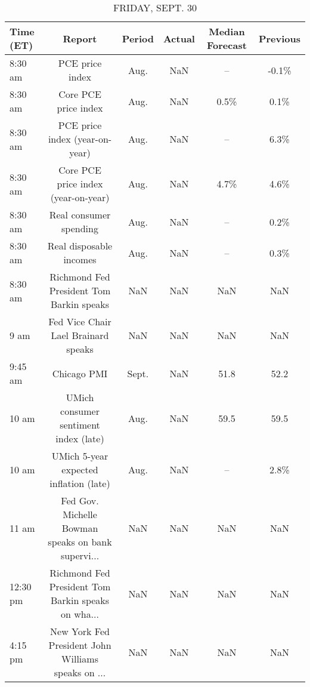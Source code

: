 \documentclass{book}
\begin{document}
  
  \begin{table}[htbp]%
  \caption{FRIDAY, SEPT. 30}%
  \centering%
  \begin{adjustbox}{width=1\textwidth}%
  \begin{tabular}{lccccc}
  \toprule
  Time (ET) &                                             Report & Period & Actual & Median Forecast & Previous \\
  \midrule
    8:30 am &                                    PCE price index &   Aug. &    NaN &              -- &    -0.1\% \\
    8:30 am &                               Core PCE price index &   Aug. &    NaN &            0.5\% &     0.1\% \\
    8:30 am &                     PCE price index (year-on-year) &   Aug. &    NaN &              -- &     6.3\% \\
    8:30 am &                Core PCE price index (year-on-year) &   Aug. &    NaN &            4.7\% &     4.6\% \\
    8:30 am &                             Real consumer spending &   Aug. &    NaN &              -- &     0.2\% \\
    8:30 am &                            Real disposable incomes &   Aug. &    NaN &              -- &     0.3\% \\
    8:30 am &           Richmond Fed President Tom Barkin speaks &    NaN &    NaN &             NaN &      NaN \\
       9 am &                Fed Vice Chair Lael Brainard speaks &    NaN &    NaN &             NaN &      NaN \\
    9:45 am &                                        Chicago PMI &  Sept. &    NaN &            51.8 &     52.2 \\
      10 am &              UMich consumer sentiment index (late) &   Aug. &    NaN &            59.5 &     59.5 \\
      10 am &             UMich 5-year expected inflation (late) &   Aug. &    NaN &              -- &     2.8\% \\
      11 am & Fed Gov. Michelle Bowman speaks on bank supervi... &    NaN &    NaN &             NaN &      NaN \\
   12:30 pm & Richmond Fed President Tom Barkin speaks on wha... &    NaN &    NaN &             NaN &      NaN \\
    4:15 pm & New York Fed President John Williams speaks on ... &    NaN &    NaN &             NaN &      NaN \\
  \bottomrule
  \end{tabular}
  \end{adjustbox}%
  \end{table}
  
\end{document}
